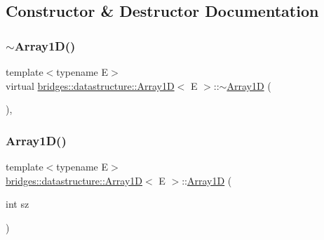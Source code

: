 \subsection{Constructor \& Destructor Documentation}
\mbox{\label{classbridges_1_1datastructure_1_1_array1_d_a690a7802e32842acfda2688459bb2caa}} 
\subsubsection{\texorpdfstring{$\sim$\+Array1\+D()}{~Array1D()}}
{\footnotesize\ttfamily template$<$typename E$>$ \\
virtual \mbox{\hyperlink{classbridges_1_1datastructure_1_1_array1_d}{bridges\+::datastructure\+::\+Array1D}}$<$ E $>$\+::$\sim$\mbox{\hyperlink{classbridges_1_1datastructure_1_1_array1_d}{Array1D}} (\begin{DoxyParamCaption}{ }\end{DoxyParamCaption})\hspace{0.3cm}{\ttfamily [inline]}, {\ttfamily [virtual]}}

\mbox{\label{classbridges_1_1datastructure_1_1_array1_d_a04e070ed24a1c6e9d200add01ec91c95}} 
\subsubsection{\texorpdfstring{Array1\+D()}{Array1D()}}
{\footnotesize\ttfamily template$<$typename E$>$ \\
\mbox{\hyperlink{classbridges_1_1datastructure_1_1_array1_d}{bridges\+::datastructure\+::\+Array1D}}$<$ E $>$\+::\mbox{\hyperlink{classbridges_1_1datastructure_1_1_array1_d}{Array1D}} (\begin{DoxyParamCaption}\item[{int}]{sz }\end{DoxyParamCaption})\hspace{0.3cm}{\ttfamily [inline]}}




